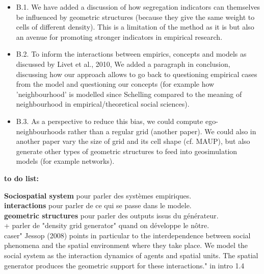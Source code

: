 \documentclass[11pt,a4paper,sans]{moderncv}        %
\begin{document}
 \begin{itemize}
 
  \item B.1. We have added a discussion of how segregation indicators can themselves be influenced by geometric structures (because they give the same weight to cells of different density). This is a limitation of the method as it is but also an avenue for promoting stronger indicators in empirical research.  
  
  \item B.2. To inform the interactions between empirics, concepts and models as discussed by Livet et al., 2010, We added a paragraph in conclusion, discussing how our approach allows to go back to questioning empirical cases from the model and questioning our concepts (for example how 'neighbourhood' is modelled since Schelling compared to the meaning of neighbourhood in empirical/theoretical social sciences). 
  
  \item B.3. As a perspective to reduce this bias, we could compute ego-neighbourhoods rather than a regular grid (another paper). We could also in another paper vary the size of grid and its cell shape (cf. MAUP), but also generate other types of geometric structures to feed into geosimulation models (for example networks). 
\end{itemize}

\bigskip

\textbf{to do list:}

 {\bf Sociospatial system} pour parler des systèmes empiriques. \\
 {\bf interactions} pour parler de ce qui se passe dans le modele.\\
  {\bf geometric structures} pour parler des outputs issus du générateur.\\
  + parler de "density grid generator" quand on développe le nôtre. \\
  caser" Jessop (2008) points in particular to the interdependence between social phenomena and the spatial environment where they take place. We model the social system as the interaction dynamics of agents and spatial units. The spatial generator produces the geometric support for these interactions." in intro 1.4 \\
  
\end{document}
